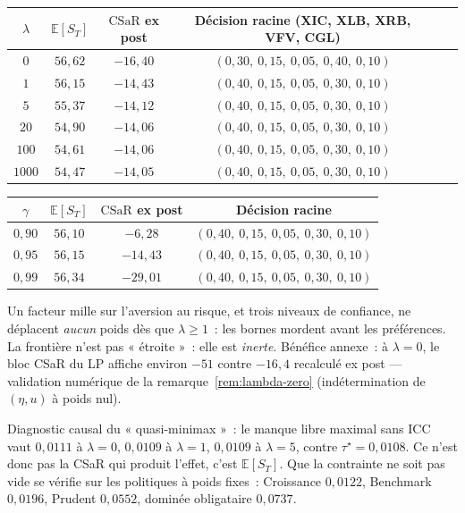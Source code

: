 \documentclass[11pt,letterpaper]{article}
\newcommand{\E}{\mathbb{E}}
\newcommand{\CSaR}{\mathrm{CSaR}}
\newcommand{\taustar}{\tau^{\star}}
\theoremstyle{definition}
\begin{document}
\begin{center}
\begin{tabular}{cccccc}
\toprule
$\lambda$ & $\E[S_T]$ & $\CSaR$ ex post & Décision racine (XIC, XLB, XRB, VFV, CGL) \\
\midrule
$0$ & $56{,}62$ & $-16{,}40$ & $(0{,}30,\ 0{,}15,\ 0{,}05,\ 0{,}40,\ 0{,}10)$ \\
$1$ & $56{,}15$ & $-14{,}43$ & $(0{,}40,\ 0{,}15,\ 0{,}05,\ 0{,}30,\ 0{,}10)$ \\
$5$ & $55{,}37$ & $-14{,}12$ & $(0{,}40,\ 0{,}15,\ 0{,}05,\ 0{,}30,\ 0{,}10)$ \\
$20$ & $54{,}90$ & $-14{,}06$ & $(0{,}40,\ 0{,}15,\ 0{,}05,\ 0{,}30,\ 0{,}10)$ \\
$100$ & $54{,}61$ & $-14{,}06$ & $(0{,}40,\ 0{,}15,\ 0{,}05,\ 0{,}30,\ 0{,}10)$ \\
$1000$ & $54{,}47$ & $-14{,}05$ & $(0{,}40,\ 0{,}15,\ 0{,}05,\ 0{,}30,\ 0{,}10)$ \\
\bottomrule
\end{tabular}
\end{center}

\begin{center}
\begin{tabular}{cccc}
\toprule
$\gamma$ & $\E[S_T]$ & $\CSaR$ ex post & Décision racine \\
\midrule
$0{,}90$ & $56{,}10$ & $-6{,}28$ & $(0{,}40,\ 0{,}15,\ 0{,}05,\ 0{,}30,\ 0{,}10)$ \\
$0{,}95$ & $56{,}15$ & $-14{,}43$ & $(0{,}40,\ 0{,}15,\ 0{,}05,\ 0{,}30,\ 0{,}10)$ \\
$0{,}99$ & $56{,}34$ & $-29{,}01$ & $(0{,}40,\ 0{,}15,\ 0{,}05,\ 0{,}30,\ 0{,}10)$ \\
\bottomrule
\end{tabular}
\end{center}

Un facteur mille sur l'aversion au risque, et trois niveaux de confiance, ne
déplacent \emph{aucun} poids dès que $\lambda \ge 1$~: les bornes mordent avant
les préférences. La frontière n'est pas « étroite »~: elle est
\emph{inerte}. Bénéfice annexe~: à $\lambda = 0$, le bloc CSaR du LP affiche
environ $-51$ contre $-16{,}4$ recalculé ex post --- validation numérique de la
remarque~\ref{rem:lambda-zero} (indétermination de $(\eta, u)$ à poids nul).

Diagnostic causal du « quasi-minimax »~: le manque libre maximal sans ICC vaut
$0{,}0111$ à $\lambda = 0$, $0{,}0109$ à $\lambda = 1$, $0{,}0109$ à
$\lambda = 5$, contre $\taustar = 0{,}0108$. Ce n'est donc pas la CSaR qui
produit l'effet, c'est $\E[S_T]$. Que la contrainte ne soit pas vide se
vérifie sur les politiques à poids fixes~: Croissance $0{,}0122$, Benchmark
$0{,}0196$, Prudent $0{,}0552$, dominée obligataire $0{,}0737$.
\end{document}
